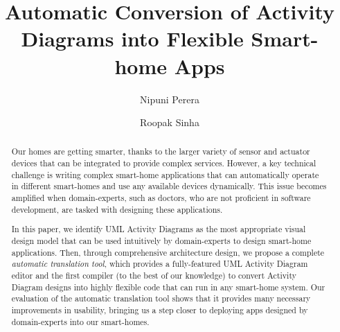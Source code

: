 \documentclass{llncs}
\begin{document}
\title{Automatic Conversion of Activity Diagrams into Flexible Smart-home Apps}
%
%
\author{Nipuni Perera \and Roopak Sinha
}%
%
%

\maketitle              %

\begin{abstract}
Our homes are getting smarter, thanks to the larger variety of sensor and actuator devices that can be integrated to provide complex services.
However, a key technical challenge is writing complex smart-home applications that can automatically operate in different smart-homes and use any available devices dynamically. This issue becomes amplified when domain-experts, such as doctors, who are not proficient in software development, are tasked with designing these applications. 

In this paper, we identify UML Activity Diagrams as the most appropriate visual design model that can be used intuitively by domain-experts to design smart-home applications. Then, through comprehensive architecture design, we propose a complete \textit{automatic translation tool}, which provides a fully-featured UML Activity Diagram editor and the first compiler (to the best of our knowledge) to convert Activity Diagram designs into highly flexible code that can run in any smart-home system. 
Our evaluation of the automatic translation tool shows that it provides many necessary improvements in usability, bringing us a step closer to deploying apps designed by domain-experts into our smart-homes.




\end{abstract}
%












\end{document}
